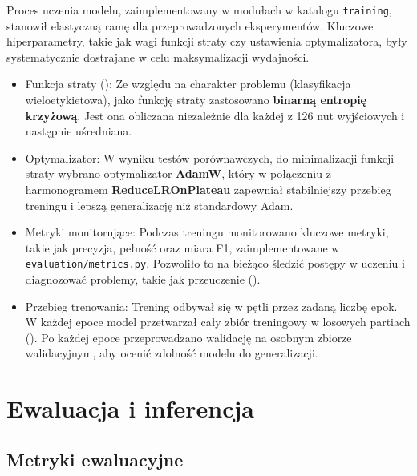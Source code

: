Proces uczenia modelu, zaimplementowany w modułach w katalogu \texttt{training}, stanowił elastyczną ramę dla przeprowadzonych eksperymentów. Kluczowe hiperparametry, takie jak wagi funkcji straty czy ustawienia optymalizatora, były systematycznie dostrajane w celu maksymalizacji wydajności.
\begin{itemize}
    \item Funkcja straty (): Ze względu na charakter problemu (klasyfikacja wieloetykietowa), jako funkcję straty zastosowano \textbf{binarną entropię krzyżową}. Jest ona obliczana niezależnie dla każdej z 126 nut wyjściowych i następnie uśredniana.
    \item Optymalizator: W wyniku testów porównawczych, do minimalizacji funkcji straty wybrano optymalizator \textbf{AdamW}, który w połączeniu z harmonogramem \textbf{ReduceLROnPlateau} zapewniał stabilniejszy przebieg treningu i lepszą generalizację niż standardowy Adam.
    \item Metryki monitorujące: Podczas treningu monitorowano kluczowe metryki, takie jak precyzja, pełność oraz miara F1, zaimplementowane w \texttt{evaluation/metrics.py}. Pozwoliło to na bieżąco śledzić postępy w uczeniu i diagnozować problemy, takie jak przeuczenie ().
    \item Przebieg trenowania: Trening odbywał się w pętli przez zadaną liczbę epok. W każdej epoce model przetwarzał cały zbiór treningowy w losowych partiach (). Po każdej epoce przeprowadzano walidację na osobnym zbiorze walidacyjnym, aby ocenić zdolność modelu do generalizacji.
\end{itemize}

\section*{Ewaluacja i inferencja}
\label{sec:tech_ewaluacja}

\subsection*{Metryki ewaluacyjne}


